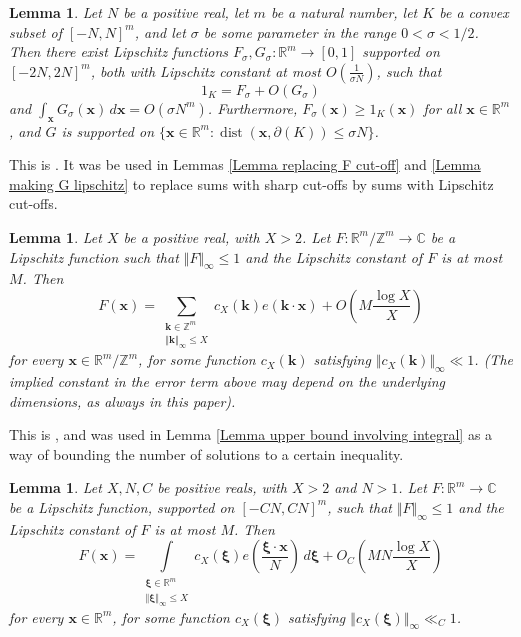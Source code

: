 \documentclass[12pt,a4paper,twoside,reqno]{amsart}
\newtheorem{Lemma}[Theorem]{Lemma}
\newcommand{\dist}{\operatorname{dist}}
\numberwithin{equation}{section}
\begin{document}
\begin{Lemma}
\label{Lipschitz approximation of convex cutoffs}
Let $N$ be a positive real, let $m$ be a natural number, let $K$ be a convex subset of $[-N,N]^m$, and let $\sigma$ be some parameter in the range $0<\sigma<1/2$. Then there exist Lipschitz functions $F_\sigma, G_\sigma:\mathbb{R}^m\longrightarrow [0,1]$ supported on $[-2N,2N]^m$, both with Lipschitz constant at most $O(\frac{1}{\sigma N})$, such that \[1_K = F_\sigma + O(G_\sigma)\] and $\int_{\mathbf{x}} G_\sigma(\mathbf{x}) \, d\mathbf{x} = O(\sigma N^m)$. Furthermore, $F_\sigma(\mathbf{x})\geqslant 1_K(\mathbf{x})$ for all $\mathbf{x}\in \mathbb{R}^m$, and $G$ is supported on $\{ \mathbf{x} \in \mathbb{R}^m: \dist(\mathbf{x},\partial(K)) \leqslant \sigma N\}$.
\end{Lemma}
\noindent This is \cite[Corollary A.3]{GT10}. It was be used in Lemmas \ref{Lemma replacing F cut-off} and \ref{Lemma making G lipschitz} to replace sums with sharp cut-offs by sums with Lipschitz cut-offs. 

\begin{Lemma}
\label{Fourier transforms of Lipschitz functions on tori}
Let $X$ be a positive real, with $X>2$. Let $F:\mathbb{R}^m/\mathbb{Z}^m\longrightarrow \mathbb{C}$ be a Lipschitz function such that $\Vert F\Vert_\infty \leqslant 1$ and the Lipschitz constant of $F$ is at most $M$. Then
\begin{equation}
F(\mathbf{x}) = \sum\limits_{\substack{\mathbf{k} \in \mathbb{Z}^m \\ \Vert \mathbf{k} \Vert_\infty \leqslant X}} c_X(\mathbf{k}) e( \mathbf{k} \cdot \mathbf{x}) + O\left(M \frac{\log X}{X}\right)
\end{equation}
for every $\mathbf{x} \in\mathbb{R}^m/\mathbb{Z}^m$, for some function $c_X(\mathbf{k})$ satisfying $\Vert c_X(\mathbf{k})\Vert_\infty \ll 1$. (The implied constant in the error term above may depend on the underlying dimensions, as always in this paper).
\end{Lemma}
\noindent This is \cite[Lemma A.9]{GrTa08}, and was used in Lemma \ref{Lemma upper bound involving integral} as a way of bounding the number of solutions to a certain inequality. 


\begin{Lemma}
\label{Fourier transforms of Lipschitz functions}
Let $X,N,C$ be positive reals, with $X>2$ and $N>1$. Let $F:\mathbb{R}^m\longrightarrow \mathbb{C}$ be a Lipschitz function, supported on $[-CN,CN]^m$, such that $\Vert F\Vert_\infty \leqslant 1$ and the Lipschitz constant of $F$ is at most $M$. Then
\begin{equation}
F(\mathbf{x}) = \int\limits_{ \substack{\boldsymbol{\xi} \in \mathbb{R}^m \\ \Vert \boldsymbol{\xi} \Vert_\infty \leqslant X} } c_X(\boldsymbol{\xi})e(\frac{\boldsymbol{\xi}\cdot \mathbf{x}}{N}) \, d\boldsymbol{\xi} + O_{C}\left(MN\frac{\log X}{X}\right) 
\end{equation}
\noindent for every $\mathbf{x} \in\mathbb{R}^m$, for some function $c_X(\boldsymbol{\xi})$ satisfying $\Vert c_X(\boldsymbol{\xi})\Vert_\infty \ll_{C} 1$. 
\end{Lemma}
\end{document}

